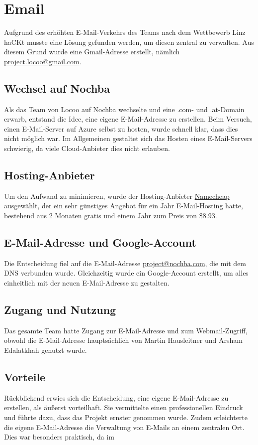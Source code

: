 \section{Email}
Aufgrund des erhöhten E-Mail-Verkehrs des Teams nach dem Wettbewerb Linz haCKt musste eine Lösung gefunden werden, um diesen zentral zu verwalten. Aus diesem Grund wurde eine Gmail-Adresse erstellt, nämlich \href{mailto:project.locoo@gmail.com}{project.locoo@gmail.com}.

\subsection{Wechsel auf Nochba}
Als das Team von Locoo auf Nochba wechselte und eine .com- und .at-Domain erwarb, entstand die Idee, eine eigene E-Mail-Adresse zu erstellen. Beim Versuch, einen E-Mail-Server auf Azure selbst zu hosten, wurde schnell klar, dass dies nicht möglich war. Im Allgemeinen gestaltet sich das Hosten eines E-Mail-Servers schwierig, da viele Cloud-Anbieter dies nicht erlauben.

\subsection{Hosting-Anbieter}
Um den Aufwand zu minimieren, wurde der Hosting-Anbieter \href{https://www.namecheap.com/}{Namecheap} ausgewählt, der ein sehr günstiges Angebot für ein Jahr E-Mail-Hosting hatte, bestehend aus 2 Monaten gratis und einem Jahr zum Preis von \$8.93.

\subsection{E-Mail-Adresse und Google-Account}
Die Entscheidung fiel auf die E-Mail-Adresse
\href{mailto:project@nochba.com}{project@nochba.com}, die mit dem DNS verbunden wurde.
Gleichzeitig wurde ein Google-Account erstellt, um alles
einheitlich mit der neuen E-Mail-Adresse zu gestalten.

\subsection{Zugang und Nutzung}
Das gesamte Team hatte Zugang zur E-Mail-Adresse und zum Webmail-Zugriff, obwohl die E-Mail-Adresse hauptsächlich von Martin Hausleitner und Arsham Edalatkhah genutzt wurde.

\subsection{Vorteile}
Rückblickend erwies sich die Entscheidung, eine eigene
E-Mail-Adresse zu erstellen, als äußerst vorteilhaft. Sie
vermittelte einen professionellen Eindruck und führte dazu,
dass das Projekt ernster genommen wurde. Zudem erleichterte
die eigene E-Mail-Adresse die Verwaltung von E-Mails an
einem zentralen Ort. Dies war besonders praktisch, da im


